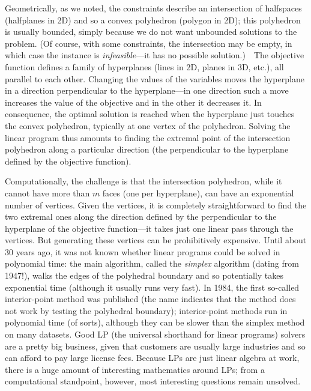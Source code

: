 \documentclass[11pt]{article}
\begin{document}
Geometrically, as we noted, the constraints describe an intersection of
halfspaces (halfplanes in 2D) and so a convex polyhedron (polygon in 2D);
this polyhedron is usually bounded,
simply because we do not want unbounded solutions to the problem.
(Of course, with some constraints, the intersection may be empty,
in which case the instance is \emph{infeasible}---it has no possible
solution.)\ \ 
The objective function defines a family of hyperplanes (lines in 2D,
planes in 3D, etc.), all parallel to each other.  Changing the values of
the variables moves the hyperplane in a direction perpendicular to the
hyperplane---in one direction such a move increases the value of the objective
and in the other it decreases it.  In consequence, the optimal solution
is reached when the hyperplane just touches the convex polyhedron, typically
at one vertex of the polyhedron.   Solving the linear program thus amounts
to finding the extremal point of the intersection polyhedron along a
particular direction (the perpendicular to the hyperplane defined by
the objective function).

Computationally, the challenge is that the intersection polyhedron, while
it cannot have more than $m$ faces (one per hyperplane), can have an
exponential number of vertices.   Given the vertices, it is completely
straightforward to find the two extremal ones along the direction defined
by the perpendicular to the hyperplane of the objective function---it takes
just one linear pass through the vertices.  But generating these vertices
can be prohibitively expensive.  Until about 30 years ago, it was not
known whether linear programs could be solved in polynomial time: the main
algorithm, called the \emph{simplex} algorithm (dating from 1947!),
walks the edges of the polyhedral boundary and so potentially takes
exponential time (although it usually runs very fast).  In 1984, the first
so-called interior-point method was published (the name indicates that
the method does not work by testing the polyhedral boundary); interior-point
methods run in polynomial time (of sorts), although they can be slower than
the simplex
method on many datasets.   Good LP (the universal shorthand for linear
programs) solvers are a pretty big business, given that customers are usually
large industries and so can afford to pay large license fees.  Because LPs
are just linear algebra at work, there is a huge amount of interesting
mathematics around LPs; from a computational standpoint, however, most
interesting questions remain unsolved.
\end{document}
